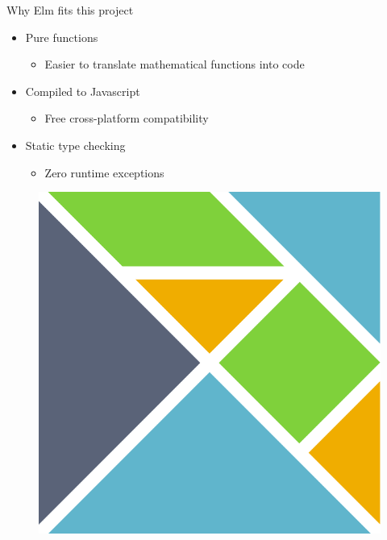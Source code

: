 \documentclass[aspectratio=169]{beamer}
\begin{document}
\begin{frame}[c]{Why Elm fits this project}
    \begin{multicols}{2}
        \begin{itemize}
            \item<1-> Pure functions
            \begin{itemize}
                \item Easier to translate mathematical functions into code
            \end{itemize}
            \item<2-> Compiled to Javascript
            \begin{itemize}
                \item Free cross-platform compatibility
            \end{itemize}
            \item<3-> Static type checking
            \begin{itemize}
                \item Zero runtime exceptions
            \end{itemize}
        \end{itemize}
        \columnbreak
        \begin{figure}
            \centering
            \includegraphics[width=.5\linewidth]{Elm_logo.pdf}
        \end{figure}
    \end{multicols}
\end{frame}
\end{document}

